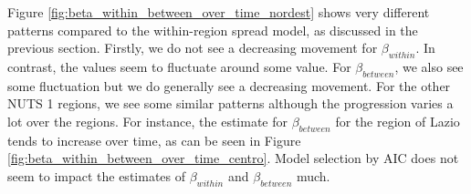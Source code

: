 \documentclass[12pt]{article}
\begin{document}
	Figure \ref{fig:beta_within_between_over_time_nordest} shows very different patterns compared to the within-region spread model, as discussed in the previous section. Firstly, we do not see a decreasing movement for $\beta_{within}$. In contrast, the values seem to fluctuate around some value. For $\beta_{between}$, we also see some fluctuation but we do generally see a decreasing movement. For the other NUTS 1 regions, we see some similar patterns although the progression varies a lot over the regions. For instance, the estimate for $\beta_{between}$ for the region of Lazio tends to increase over time, as can be seen in Figure \ref{fig:beta_within_between_over_time_centro}. Model selection by AIC does not seem to impact the estimates of $\beta_{within}$ and $\beta_{between}$ much.
	

\end{document}
